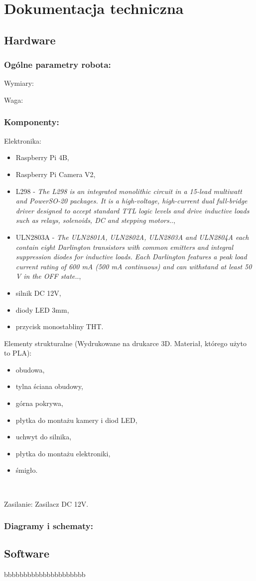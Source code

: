 \section{Dokumentacja techniczna}
\subsection{Hardware}
\subsubsection{Ogólne parametry robota:}
Wymiary: 

Waga:

\subsubsection{Komponenty:}
Elektronika:
    \begin{itemize}
        \item Raspberry Pi 4B,
        \item Raspberry Pi Camera V2,
        \item L298 - \textit{The L298 is an integrated monolithic circuit in a 15-lead multiwatt and PowerSO-20
        packages. It is a high-voltage, high-current dual full-bridge driver designed to accept
        standard TTL logic levels and drive inductive loads such as relays, solenoids, DC
        and stepping motors.}.\cite{L298},
        \item ULN2803A - \textit{The ULN2801A, ULN2802A, ULN2803A and
        ULN2804A each contain eight Darlington
        transistors with common emitters and integral
        suppression diodes for inductive loads. Each
        Darlington features a peak load current rating of
        600 mA (500 mA continuous) and can withstand
        at least 50 V in the OFF state.}.\cite{ULN2803a},
        \item silnik DC 12V,
        \item diody LED 3mm,
        \item przycisk monostabliny THT.
    \end{itemize}

Elementy strukturalne (Wydrukowane na drukarce 3D. Materiał, którego użyto to PLA):
    \begin{itemize}
        \item obudowa,
        \item tylna ściana obudowy,
        \item górna pokrywa,
        \item płytka do montażu kamery i diod LED,
        \item uchwyt do silnika,
        \item płytka do montażu elektroniki,
        \item śmigło.
    \end{itemize}\

Zasilanie:
Zasilacz DC 12V.

\subsubsection{Diagramy i schematy:}








\subsection{Software}
bbbbbbbbbbbbbbbbbbbbb